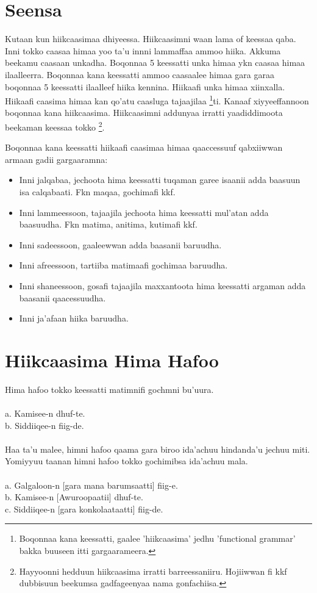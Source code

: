 \documentclass[11pt,b5paper]{book}
\begin{document}
\section{Seensa}
Kutaan kun hiikcaasimaa dhiyeessa. Hiikcaasimni waan lama of keessaa qaba. Inni tokko caasaa himaa yoo ta'u innni lammaffaa ammoo hiika. Akkuma beekamu caasaan unkadha. Boqonnaa 5 keessatti unka himaa ykn caasaa himaa ilaalleerra. Boqonnaa kana keessatti ammoo caasaalee himaa gara garaa boqonnaa 5 keessatti ilaalleef hiika kennina. Hiikaafi unka himaa xiinxalla. Hiikaafi caasima himaa kan qo'atu caasluga tajaajilaa \footnote{Boqonnaa kana keessatti, gaalee 'hiikcaasima' jedhu 'functional grammar' bakka buuseen itti gargaarameera.}ti. Kanaaf xiyyeeffannoon boqonnaa kana hiikcaasima. Hiikcaasimni addunyaa irratti yaadiddimoota beekaman keessaa tokko \footnote{Hayyoonni hedduun hiikcaasima irratti barreessaniiru. Hojiiwwan \cite{siewierska1984passive,shibatani1985passives,halliday1994introduction,kulikov1993second,mous2001middle,tolemariam2009} fi kkf dubbisuun beekumsa gadfageenyaa nama gonfachiisa.}. 

Boqonnaa kana keessatti hiikaafi caasimaa himaa qaaccessuuf qabxiiwwan armaan gadii gargaaramna:\\
\begin{itemize}
	\item Inni jalqabaa, jechoota hima keessatti tuqaman garee isaanii adda baasuun isa calqabaati. Fkn maqaa, gochimafi kkf. 
	\item Inni lammeessoon, tajaajila jechoota hima keessatti mul’atan adda baasuudha. Fkn matima, anitima, kutimafi kkf.
	\item Inni sadeessoon, gaaleewwan adda baasanii baruudha. 
	\item Inni afreessoon, tartiiba matimaafi gochimaa baruudha.
	\item Inni shaneessoon, gosafi tajaajila maxxantoota hima keessatti argaman adda baasanii qaacessuudha.
	\item Inni ja'afaan hiika baruudha.
	
\end{itemize}


\section{Hiikcaasima Hima Hafoo}
Hima hafoo tokko keessatti matimnifi gochmni bu’uura.\\
\\
a. Kamisee-n dhuf-te.\\
b. Siddiiqee-n fiig-de. \\
\\
Haa ta'u malee, himni hafoo qaama gara biroo ida’achuu hindanda’u jechuu miti.
Yomiyyuu taanan himni hafoo tokko gochimibsa ida’achuu mala. \\
\\
a. Galgaloon-n [gara mana barumsaatti] fiig-e.\\
b. Kamisee-n [Awuroopaatii] dhuf-te.\\
c. Siddiiqee-n [gara konkolaataatti] fiig-de. 
\end{document}
